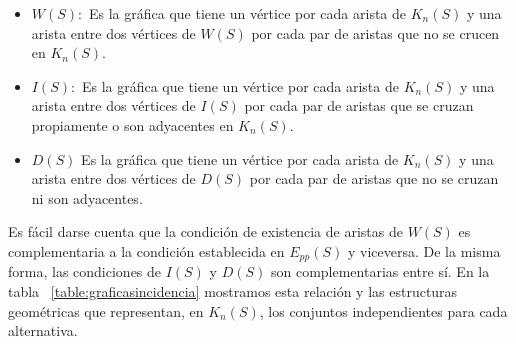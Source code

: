 \begin{itemize}
  \item $W(S):$ Es la gráfica que tiene un vértice por cada arista de $K_n(S)$ y
  una arista entre dos vértices de $W(S)$ por cada par de aristas que no se
  crucen en $K_n(S)$. %
  \item $I(S):$ Es la gráfica que tiene un vértice por cada arista de $K_n(S)$ y
  una arista entre dos vértices de $I(S)$ por cada par de aristas que
  se cruzan propiamente o son adyacentes en $K_n(S)$. %
  \item $D(S)$ Es la gráfica que tiene un vértice por cada arista de $K_n(S)$ y
  una arista entre dos vértices de $D(S)$ por cada par de aristas que
  no se cruzan ni son adyacentes. %
\end{itemize}

Es fácil darse cuenta que la condición de existencia de aristas de $W(S)$ es
complementaria a la condición establecida en $E_{pp}(S)$ y viceversa. De la misma
forma, las condiciones de $I(S)$ y $D(S)$ son complementarias entre sí. En la tabla
~\ref{table:graficasincidencia} mostramos esta relación y las estructuras geométricas
que representan, en $K_n(S)$, los conjuntos independientes para cada alternativa.

